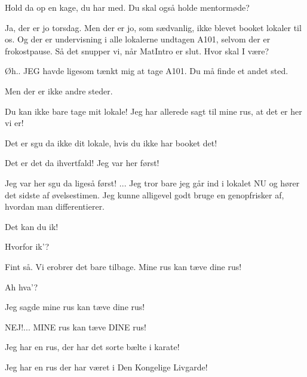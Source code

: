 \documentclass[a4paper,11pt]{article}
\begin{document}
\begin{sketch}


 Hold da op en kage, du har med. Du skal også holde mentormøde?

 Ja, der er jo torsdag. Men der er jo, som sædvanlig, ikke blevet booket lokaler til os. Og der er undervisning i alle lokalerne undtagen A101, selvom der er frokostpause. Så det snupper vi, når MatIntro er slut. Hvor skal I være?

 Øh.. JEG havde ligesom tænkt mig at tage A101. Du må finde et andet sted.

 Men der er ikke andre steder.

 Du kan ikke bare tage mit lokale! Jeg har allerede sagt til mine rus, at det er her vi er!

 Det er sgu da ikke dit lokale, hvis du ikke har booket det!

 Det er det da ihvertfald! Jeg var her først!

 Jeg var her sgu da ligeså først! ... Jeg tror bare jeg går ind i lokalet NU og hører det sidste af øvelsestimen. Jeg kunne alligevel godt bruge en genopfrisker af, hvordan man differentierer.


 Det kan du ik!

 Hvorfor ik'?

 Fint så. Vi erobrer det bare tilbage. Mine rus kan tæve dine rus!


 Ah hva'?

 Jeg sagde mine rus kan tæve dine rus!

 NEJ!... MINE rus kan tæve DINE rus!

 Jeg har en rus, der har det sorte bælte i karate!


 Jeg har en rus der har været i Den Kongelige Livgarde!



\end{sketch}
\end{document}
